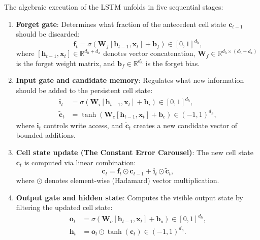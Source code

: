 \documentclass[../../main.tex]{subfiles}
\begin{document}
The algebraic execution of the LSTM unfolds in five sequential stages:
\begin{enumerate}
    \item \textbf{Forget gate}: Determines what fraction of the antecedent cell state $\mathbf{c}_{t-1}$ should be discarded:
    \begin{equation}
    \mathbf{f}_t = \sigma\left(\mathbf{W}_f \left[\mathbf{h}_{t-1}, \mathbf{x}_t\right] + \mathbf{b}_f\right) \in [0, 1]^{d_h},
    \label{eq:lstm_forget_gate}
    \end{equation}
    where $\left[\mathbf{h}_{t-1}, \mathbf{x}_t\right] \in \mathbb{R}^{d_h + d_x}$ denotes vector concatenation, $\mathbf{W}_f \in \mathbb{R}^{d_h \times (d_h + d_x)}$ is the forget weight matrix, and $\mathbf{b}_f \in \mathbb{R}^{d_h}$ is the forget bias.
    
    \item \textbf{Input gate and candidate memory}: Regulates what new information should be added to the persistent cell state:
    \begin{align}
    \mathbf{i}_t & = \sigma\left(\mathbf{W}_i \left[\mathbf{h}_{t-1}, \mathbf{x}_t\right] + \mathbf{b}_i\right) \in [0, 1]^{d_h}, \label{eq:lstm_input_gate} \\
    \tilde{\mathbf{c}}_t & = \tanh\left(\mathbf{W}_c \left[\mathbf{h}_{t-1}, \mathbf{x}_t\right] + \mathbf{b}_c\right) \in (-1, 1)^{d_h}, \label{eq:lstm_candidate_cell}
    \end{align}
    where $\mathbf{i}_t$ controls write access, and $\tilde{\mathbf{c}}_t$ creates a new candidate vector of bounded additions.
    
    \item \textbf{Cell state update (The Constant Error Carousel)}: The new cell state $\mathbf{c}_t$ is computed via linear combination:
    \begin{equation}
    \mathbf{c}_t = \mathbf{f}_t \odot \mathbf{c}_{t-1} + \mathbf{i}_t \odot \tilde{\mathbf{c}}_t,
    \label{eq:lstm_cell_state_update}
    \end{equation}
    where $\odot$ denotes element-wise (Hadamard) vector multiplication.
    
    \item \textbf{Output gate and hidden state}: Computes the visible output state by filtering the updated cell state:
    \begin{align}
    \mathbf{o}_t & = \sigma\left(\mathbf{W}_o \left[\mathbf{h}_{t-1}, \mathbf{x}_t\right] + \mathbf{b}_o\right) \in [0, 1]^{d_h}, \label{eq:lstm_output_gate} \\
    \mathbf{h}_t & = \mathbf{o}_t \odot \tanh\left(\mathbf{c}_t\right) \in (-1, 1)^{d_h}. \label{eq:lstm_hidden_output}
    \end{align}
\end{enumerate}
\end{document}
